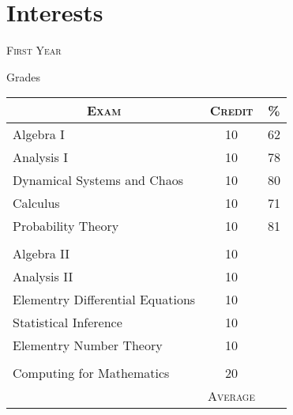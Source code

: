 \documentclass[a4paper, 11pt]{article}
\begin{document}
\section{Interests}


\bigskip
\par{\centering\Large {\textsc{First Year}}
\par}\large{\centering Grades\par}\normalsize

\begin{center}
\begin{tabular}{lcc}

\multicolumn{1}{c}{\textsc{Exam}} & \textsc{Credit}&\textsc{\%}\\ \hline
Algebra I & 10 & 62\\
Analysis I & 10 & 78\\
Dynamical Systems and Chaos & 10 & 80\\
Calculus & 10 & 71\\
Probability Theory & 10 & 81\\
\\
Algebra II & 10 & \\
Analysis II & 10 & \\
Elementry Differential Equations & 10 & \\
Statistical Inference & 10 & \\
Elementry Number Theory & 10 & \\
\\
Computing for Mathematics & 20 & \\
\cline{2-3}
&\textsc{Average}&\textbf{}

\end{tabular}
\end{center}
\bigskip
\end{document}
